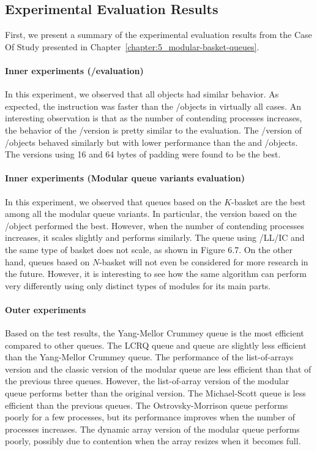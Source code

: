 \subsection{Experimental Evaluation Results}

First, we present a summary of the experimental evaluation results from the Case Of Study presented in Chapter~\ref{chapter:5_modular-basket-queues}.

\paragraph*{Inner experiments (\LL/\IC evaluation)}  In this experiment, we observed that all objects had similar behavior. As expected, the \FAI instruction was faster than the \LL/\IC objects in virtually all cases. An interesting observation is that as the number of contending processes increases, the behavior of the \LL/\IC \CAS version is pretty similar to the \FAI evaluation. The \R/\W version of \LL/\IC objects behaved similarly but with lower performance than the \FAI and \CAS \LL/\IC objects. The versions using 16 and 64 bytes of padding were found to be the best.

\paragraph*{Inner experiments (Modular queue variants evaluation)} In this experiment, we observed that queues based on the \(K\)-basket are the best among all the modular queue variants. In particular, the version based on the \CAS \LL/\IC object performed the best. However, when the number of contending processes increases, it scales slightly and performs similarly. The queue using \R/\W LL/IC and the same type of basket does not scale, as shown in Figure 6.7. On the other hand, queues based on \(N\)-basket will not even be considered for more research in the future. However, it is interesting to see how the same algorithm can perform very differently using only distinct types of modules for its main parts.

\paragraph*{Outer experiments} Based on the test results, the Yang-Mellor Crummey queue is the most efficient compared to other queues. The LCRQ queue and \FAI queue are slightly less efficient than the Yang-Mellor Crummey queue. The performance of the list-of-arrays version and the classic version of the modular queue are less efficient than that of the previous three queues. However, the list-of-array version of the modular queue performs better than the original version. The Michael-Scott queue is less efficient than the previous queues. The Ostrovsky-Morrison queue performs poorly for a few processes, but its performance improves when the number of processes increases. The dynamic array version of the modular queue performs poorly, possibly due to contention when the array resizes when it becomes full.

